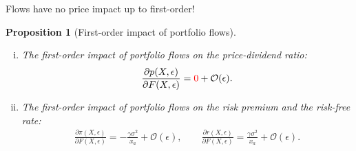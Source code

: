 \documentclass[12pt,aspectratio=169]{beamer}
\providecommand{\propositionname}{Proposition}
\newtheorem{prop}{\protect\propositionname}
\providecommand{\propositionname}{Proposition}
\begin{document}
\begin{frame}{Flows have no price impact up to first-order!}
    \begin{prop}[First-order impact of portfolio flows]\label{prop:elasticity_first_order}
        
    	\begin{enumerate}[(i)]
    		\item The first-order impact of portfolio flows on the price-dividend ratio:
    		\begin{equation*}
    			\frac{\partial p(X,\epsilon)}{\partial F(X,\epsilon)} = 
    			\textcolor{red}{0} +\mathcal{O}(\epsilon).
    		\end{equation*}
    		\item The first-order impact of portfolio flows on the risk premium and the risk-free rate:
    		\begin{align*}
    			\frac{\partial \pi(X,\epsilon)}{\partial F(X,\epsilon)} %
    			=-\frac{\gamma \sigma^2}{x_a}  +\mathcal{O}(\epsilon),
    			\qquad
    			\frac{\partial r(X,\epsilon)}{\partial F(X,\epsilon)} = 
    			\frac{\gamma \sigma^2}{x_a} +\mathcal{O}(\epsilon).
		    \end{align*}
    	\end{enumerate}
    \end{prop}
\end{frame}
\end{document}
